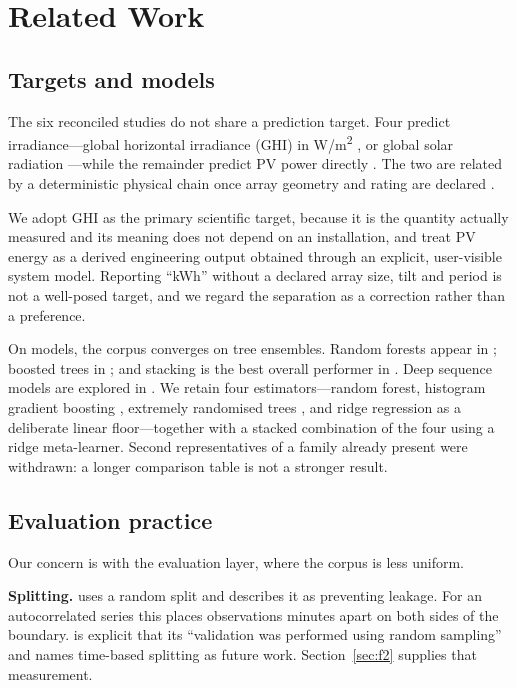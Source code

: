 \documentclass[conference]{IEEEtran}
\begin{document}
\section{Related Work}

\subsection{Targets and models}

The six reconciled studies do not share a prediction target. Four
predict irradiance---global horizontal irradiance (GHI) in
W/m\textsuperscript{2} \cite{P2,P3,P4}, or global solar radiation
\cite{P4}---while the remainder predict PV power directly
\cite{P1,P5,P6}. The two are related by a deterministic physical chain
once array geometry and rating are declared \cite{P1}.

We adopt GHI as the primary scientific target, because it is the
quantity actually measured and its meaning does not depend on an
installation, and treat PV energy as a derived engineering output
obtained through an explicit, user-visible system model. Reporting
``kWh'' without a declared array size, tilt and period is not a
well-posed target, and we regard the separation as a correction rather
than a preference.

On models, the corpus converges on tree ensembles. Random forests
\cite{breiman2001} appear in \cite{P2,P4,P5}; boosted trees in
\cite{P2,P3,P4,P5}; and stacking \cite{wolpert1992} is the best overall
performer in \cite{P4}. Deep sequence models are explored in
\cite{P6}. We retain four estimators---random forest, histogram
gradient boosting \cite{ke2017}, extremely randomised trees
\cite{geurts2006}, and ridge regression \cite{hoerl1970} as a
deliberate linear floor---together with a stacked combination of the
four using a ridge meta-learner. Second representatives of a family
already present were withdrawn: a longer comparison table is not a
stronger result.

\subsection{Evaluation practice}

Our concern is with the evaluation layer, where the corpus is less
uniform.

\textbf{Splitting.} \cite{P2} uses a random split and describes it as
preventing leakage. For an autocorrelated series this places
observations minutes apart on both sides of the boundary. \cite{P5} is
explicit that its ``validation was performed using random sampling''
and names time-based splitting as future work. Section~\ref{sec:f2}
supplies that measurement.
\end{document}
